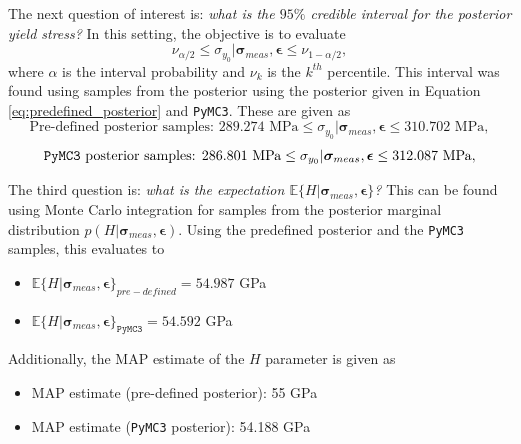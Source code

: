 \documentclass{article}
\begin{document}
	The next question of interest is: \emph{what is the $95\%$ credible interval for the posterior yield stress?} In this setting, the objective is to evaluate
	\begin{equation}
		\nu_{\alpha/2} \leq \sigma_{y_0} \vert \boldsymbol\sigma_{meas}, \boldsymbol\epsilon \leq \nu_{1 - \alpha/2},
	\end{equation}
	where $\alpha$ is the interval probability and $\nu_k$ is the $k^{th}$ percentile. This interval was found using samples from the posterior using the posterior given in Equation \eqref{eq:predefined_posterior} and \texttt{PyMC3}. These are given as
	\begin{equation}
		\text{Pre-defined posterior samples: } 289.274 \text{ MPa} \leq \sigma_{y_0} \vert \boldsymbol\sigma_{meas}, \boldsymbol\epsilon \leq 310.702 \text{ MPa},
	\end{equation}
	\begin{equation}
		\text{\texttt{PyMC3} posterior samples: } 286.801 \text{ MPa} \leq \sigma_{y_0} \vert \boldsymbol\sigma_{meas}, \boldsymbol\epsilon \leq 312.087  \text{ MPa},
	\end{equation}
	\clearpage
	
	The third question is: \emph{what is the expectation $\mathbb{E} \{  H \vert \boldsymbol\sigma_{meas}, \boldsymbol\epsilon \}$?} This can be found using Monte Carlo integration for samples from the posterior marginal distribution $p(H \vert \boldsymbol\sigma_{meas}, \boldsymbol\epsilon)$. Using the predefined posterior and the \texttt{PyMC3} samples, this evaluates to
	\begin{itemize}
		\item $\mathbb{E} \{  H \vert \boldsymbol\sigma_{meas}, \boldsymbol\epsilon \}_{pre-defined} = 54.987$ GPa
		\item $\mathbb{E} \{  H \vert \boldsymbol\sigma_{meas}, \boldsymbol\epsilon \}_{\texttt{PyMC3}} = 54.592$ GPa
	\end{itemize}

	Additionally, the MAP estimate of the $H$ parameter is given as
	\begin{itemize}
		\item MAP estimate (pre-defined posterior): 55 GPa
		\item MAP estimate (\texttt{PyMC3} posterior): 54.188 GPa
	\end{itemize}
	
\end{document}
